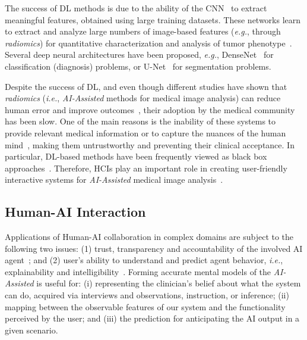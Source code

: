 The success of DL methods is due to the ability of the CNN~\cite{greenspan2016guest} to extract meaningful features, obtained using large training datasets.
These networks learn to extract and analyze large numbers of image-based features ({\it e.g.}, through {\it radiomics}) for quantitative characterization and analysis of tumor phenotype~\cite{10.1007/978-3-319-59876-5_7}.
Several deep neural architectures have been proposed, {\it e.g.}, DenseNet~\cite{huang2017densely} for classification (diagnosis) problems, or U-Net~\cite{ronneberger2015u} for segmentation problems.

Despite the success of DL, and even though different studies have shown that {\it radiomics} ({\it i.e.}, {\it AI-Assisted} methods for medical image analysis) can reduce human error and improve outcomes~\cite{Cai:2019:HTC:3290605.3300234,delvaux2017effects,middleton2016clinical}, their adoption by the medical community has been slow.
One of the main reasons is the inability of these systems to provide relevant medical information or to capture the nuances of the human mind~\cite{khairat2018reasons, kohli2018cad, 10.1145/2858036.2858373}, making them untrustworthy and preventing their clinical acceptance.
In particular, DL-based methods have been frequently viewed as black box approaches~\cite{litjens2017survey}.
Therefore, HCIs play an important role in creating user-friendly interactive systems for {\it AI-Assisted} medical image analysis~\cite{https://doi.org/10.13140/rg.2.2.30479.43682, Calisto:2017:TTM:3132272.3134111, https://doi.org/10.13140/rg.2.2.33421.59360}.

\subsection{Human-AI Interaction}

Applications of Human-AI collaboration in complex domains are subject to  the following two issues:
(1) trust, transparency and accountability of the involved AI agent~\cite{amershi2019guidelines}; and
(2) user's ability to understand and predict agent behavior, {\em i.e.}, explainability and intelligibility~\cite{Cai:2019:EEE:3301275.3302289, gunning2017explainable, 10.1007/978-3-319-99740-7_1, miller2018explanation}.
Forming accurate mental models of the {\it AI-Assisted} is useful for:
(i) representing the clinician's belief about what the system can do, acquired via interviews and observations, instruction, or inference;
(ii) mapping between the observable features of our system and the functionality perceived by the user; and (iii) the prediction for anticipating the AI output in a given scenario.

